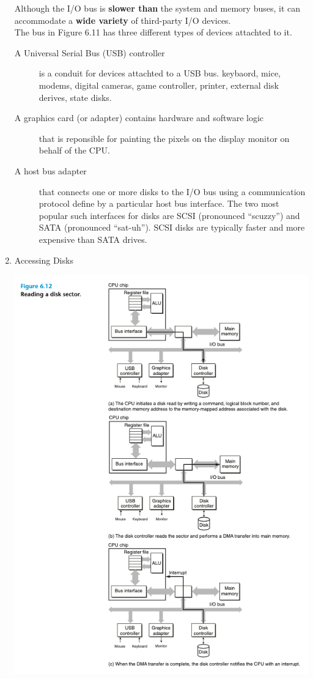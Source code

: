\documentclass[11pt]{article}
\begin{document}
\begin{enumerate}
Although the I/O bus is \textbf{slower than} the system and memory buses, it can accommodate a \textbf{wide variety} of third-party I/O devices.\\

The bus in Figure 6.11 has three different types of devices attachted to it.\\
\begin{description}
\item[{A Universal Serial Bus (USB) controller}] is a conduit for devices attachted to a USB bus. keybaord, mice, modems, digital cameras, game controller, printer, external disk derives, state disks.\\
\item[{A graphics card (or adapter) contains hardware and software logic}] that is reponsible for painting the pixels on the display monitor on behalf of the CPU.\\
\item[{A host bus adapter}] that connects one or more disks to the I/O bus using a communication protocol define by a particular host bus interface. The two most popular such interfaces for disks are SCSI (pronounced “scuzzy”) and SATA (pronounced “sat-uh”). SCSI disks are typically faster and more expensive than SATA drives.\\
\end{description}


\item Accessing Disks
\label{sec:orgea7cdb6}

\begin{center}
\includegraphics[width=.9\linewidth]{pics/figure6.12-reading-a-disk-sector.png}
\end{center}


\end{enumerate}
\end{document}
